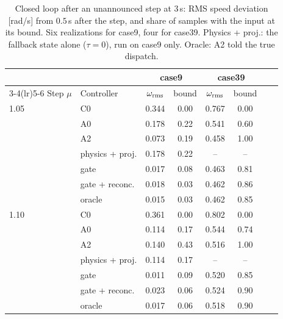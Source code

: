 \documentclass[preprint,12pt]{elsarticle}
\begin{document}
\begin{table}[!t]\centering\small
\setlength{\tabcolsep}{4pt}
\caption{Closed loop after an unannounced step at $3$\,s: RMS speed deviation [rad/s] from $0.5$\,s after the step, and share of samples with the input at its bound. Six realizations for case9, four for case39. Physics + proj.: the fallback state alone ($\tau=0$), run on case9 only. Oracle: A2 told the true dispatch.}
\label{tab:gate_cl}
\begin{tabular}{llcccccc}
\toprule
 & & \multicolumn{2}{c}{case9} & \multicolumn{2}{c}{case39}\\
\cmidrule(lr){3-4}\cmidrule(lr){5-6}
Step $\mu$ & Controller & $\omega_{\rm rms}$ & bound & $\omega_{\rm rms}$ & bound\\
\midrule
1.05 & C0 & 0.344 & 0.00 & 0.767 & 0.00\\
 & A0 & 0.178 & 0.22 & 0.541 & 0.60\\
 & A2 & 0.073 & 0.19 & 0.458 & 1.00\\
 & physics + proj. & 0.178 & 0.22 & -- & --\\
 & gate & 0.017 & 0.08 & 0.463 & 0.81\\
 & gate + reconc. & 0.018 & 0.03 & 0.462 & 0.86\\
 & oracle & 0.015 & 0.03 & 0.462 & 0.85\\
1.10 & C0 & 0.361 & 0.00 & 0.802 & 0.00\\
 & A0 & 0.114 & 0.17 & 0.544 & 0.74\\
 & A2 & 0.140 & 0.43 & 0.516 & 1.00\\
 & physics + proj. & 0.114 & 0.17 & -- & --\\
 & gate & 0.011 & 0.09 & 0.520 & 0.85\\
 & gate + reconc. & 0.023 & 0.06 & 0.524 & 0.90\\
 & oracle & 0.017 & 0.06 & 0.518 & 0.90\\
\bottomrule
\end{tabular}
\end{table}
\end{document}
